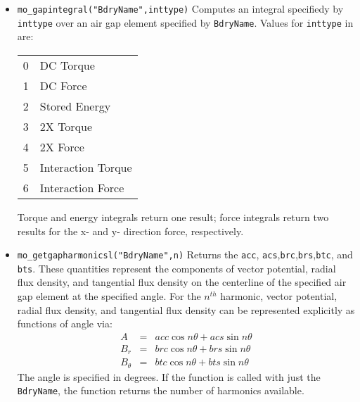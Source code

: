 \begin{itemize}
\item{\verb+mo_gapintegral("BdryName",inttype)+}
Computes an integral specifiedy by \verb+inttype+ over an air gap element specified
by \verb+BdryName+. Values for {\tt inttype} in are:
\begin{center}
\begin{tabular}{ll} \hline
0  & DC Torque\\
1  & DC Force\\
2  & Stored Energy\\
3  & 2X Torque\\
4  & 2X Force\\
5  & Interaction Torque\\
6  & Interaction Force\\
\hline
\end{tabular}
\end{center}
Torque and energy integrals return one result; force integrals return two results for the x- and y- direction force, respectively.

\item{\verb+mo_getgapharmonicsl("BdryName",n)+}
Returns the {\tt acc}, {\tt acs},{\tt brc},{\tt  brs},{\tt  btc}, and {\tt bts}.  These quantities represent the
components of vector potential, radial flux density, and tangential flux density on the centerline of the specified air gap element at the specified angle.  
For the $n^{th}$ harmonic, vector potential, radial flux density, and tangential flux density can be represented explicitly as functions of angle via:
\begin{eqnarray}
A    & = & acc \cos{n \theta} + acs \sin{n \theta} \nonumber  \\ 
B_r & = & brc \cos{n \theta}+ brs \sin{n \theta}   \nonumber \\
B_\theta & = & btc \cos{n \theta} + bts \sin{n \theta}  \nonumber
\end{eqnarray}
 The angle is  specified in degrees.  If the function is called with just the {\tt BdryName}, the function returns the number of harmonics available.

\end{itemize}


